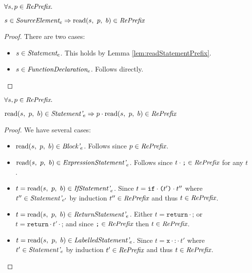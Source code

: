 \documentclass[preprint,10pt]{sigplanconf}
\begin{document}
\begin{lemma}\mbox{}
  
  \( \forall s, p \in \textit{RePrefix}. \)

  \( 
  s \in \textit{SourceElement}_{e} \Rightarrow 
  \textrm{read}(s,~p,~b) \in \textit{RePrefix}
  \)
\end{lemma}
\begin{proof}
  There are two cases:
  \begin{itemize}
  \item \( s \in \textit{Statement}_{e} \). This holds by
    Lemma \ref{lem:readStatementPrefix}.

  \item \( s \in \textit{FunctionDeclaration}_{e} \). Follows directly.
  \end{itemize}
\end{proof}

\begin{lemma}\mbox{}

  \( \forall s, p \in \textit{RePrefix}. \)

  \( \textrm{read}(s,~p,~b) \in \textit{Statement'}_{e} \Rightarrow p \cdot \textrm{read}(s,~p,~b) \in \textit{RePrefix} \)
\end{lemma}
\begin{proof}
  We have several cases:
  \begin{itemize}
  \item \( \textrm{read}(s,~p,~b) \in \textit{Block'}_{e} \). Follows since \(
    p \in \textit{RePrefix} \).

  \item \( \textrm{read}(s,~p,~b) \in \textit{ExpressionStatement'}_{e} \).
    Follows since \( t \cdot \texttt{;} \in \textit{RePrefix} \) for any \( t \).
    
  \item \( t = \textrm{read}(s,~p,~b) \in \textit{IfStatement'}_{e} \). Since
    \( t = \texttt{if}\cdot \texttt{(}t'\texttt{)}\cdot t'' \) where \( t'' \in
    \textit{Statement'}_{e'} \) by induction \( t'' \in \textit{RePrefix} \) and
    thus \( t \in \textit{RePrefix} \).
    
  \item \( t = \textrm{read}(s,~p,~b) \in \textit{ReturnStatement'}_{e} \).
    Either \( t = \texttt{return}\cdot \texttt{;} \) 
    or \( t = \texttt{return}\cdot t' \cdot \texttt{;} \)
    and since \( \texttt{;} \in \textit{RePrefix} \) then \( t \in \textit{RePrefix} \).

  \item \( t = \textrm{read}(s,~p,~b) \in \textit{LabelledStatement'}_{e} \).
    Since \( t = \texttt{x}\cdot \texttt{:}\cdot t' \) where \( t' \in
    \textit{Statement'}_{e} \) by induction \( t' \in \textit{RePrefix} \) and
    thus \( t \in \textit{RePrefix} \).

  \end{itemize}
\end{proof}
\end{document}
